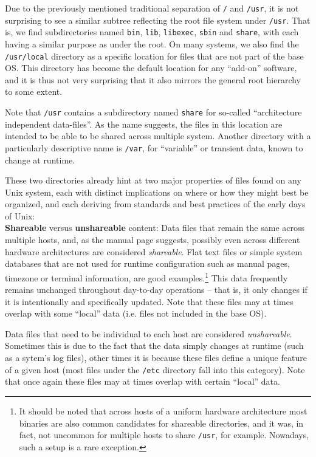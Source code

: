 Due to the previously mentioned traditional separation
of {\tt /} and {\tt /usr}, it is not surprising to see
a similar subtree reflecting the root file system
under {\tt /usr}.  That is, we find subdirectories
named {\tt bin}, {\tt lib}, {\tt libexec}, {\tt sbin}
and {\tt share}, with each having a similar purpose as
under the root.  On many systems, we also find the
{\tt /usr/local} directory as a specific location for
files that are not part of the base OS.  This
directory has become the default location for any
``add-on'' software, and it is thus not very
surprising that it also mirrors the general root
hierarchy to some extent.

Note that {\tt /usr} contains a subdirectory named
{\tt share} for so-called ``architecture independent
data-files''.  As the name suggests, the files in this
location are intended to be able to be shared across
multiple system.  Another directory with a
particularly descriptive name is {\tt /var}, for
``variable'' or transient data, known to change at
runtime.

These two directories already hint at two major
properties of files found on any Unix system, each
with distinct implications on where or how they might
best be organized\cite{fhs}, and each deriving from
standards and best practices of the early days of
Unix: \\

{\bf Shareable} versus {\bf unshareable} content:
Data files that remain the same across multiple hosts,
and, as the manual page suggests, possibly even across
different hardware architectures are considered {\em
shareable}.  Flat text files or simple system
databases that are not used for runtime configuration
such as manual pages, timezone or terminal
information, are good examples.\footnote{It should be
noted that across hosts of a uniform hardware
architecture most binaries are also common candidates
for shareable directories, and it was, in fact, not
uncommon for multiple hosts to share {\tt /usr}, for
example.  Nowadays, such a setup is a rare exception.}
This data frequently remains unchanged throughout
day-to-day operations -- that is, it only changes if
it is intentionally and specifically updated.  Note
that these files may at times overlap with some
``local'' data (i.e. files not included in the base
OS).

Data files that need to be individual to each host are
considered {\em unshareable}.  Sometimes this is due
to the fact that the data simply changes at runtime
(such as a sytem's log files), other times it is
because these files define a unique feature of a given
host (most files under the {\tt /etc} directory fall
into this category).  Note that once again these files
may at times overlap with certain ``local'' data.  \\

